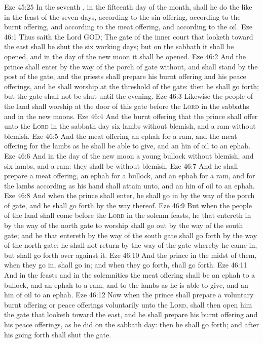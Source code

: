 \vs Eze 45:25 In the seventh , in the fifteenth day of the month, shall he do the like in the feast of the seven days, according to the sin offering, according to the burnt offering, and according to the meat offering, and according to the oil.
\vs Eze 46:1 Thus saith the Lord GOD; The gate of the inner court that looketh toward the east shall be shut the six working days; but on the sabbath it shall be opened, and in the day of the new moon it shall be opened.
\vs Eze 46:2 And the prince shall enter by the way of the porch of  gate without, and shall stand by the post of the gate, and the priests shall prepare his burnt offering and his peace offerings, and he shall worship at the threshold of the gate: then he shall go forth; but the gate shall not be shut until the evening.
\vs Eze 46:3 Likewise the people of the land shall worship at the door of this gate before the \textsc{Lord} in the sabbaths and in the new moons.
\vs Eze 46:4 And the burnt offering that the prince shall offer unto the \textsc{Lord} in the sabbath day  six lambs without blemish, and a ram without blemish.
\vs Eze 46:5 And the meat offering  an ephah for a ram, and the meat offering for the lambs as he shall be able to give, and an hin of oil to an ephah.
\vs Eze 46:6 And in the day of the new moon  a young bullock without blemish, and six lambs, and a ram: they shall be without blemish.
\vs Eze 46:7 And he shall prepare a meat offering, an ephah for a bullock, and an ephah for a ram, and for the lambs according as his hand shall attain unto, and an hin of oil to an ephah.
\vs Eze 46:8 And when the prince shall enter, he shall go in by the way of the porch of  gate, and he shall go forth by the way thereof.
\vs Eze 46:9 But when the people of the land shall come before the \textsc{Lord} in the solemn feasts, he that entereth in by the way of the north gate to worship shall go out by the way of the south gate; and he that entereth by the way of the south gate shall go forth by the way of the north gate: he shall not return by the way of the gate whereby he came in, but shall go forth over against it.
\vs Eze 46:10 And the prince in the midst of them, when they go in, shall go in; and when they go forth, shall go forth.
\vs Eze 46:11 And in the feasts and in the solemnities the meat offering shall be an ephah to a bullock, and an ephah to a ram, and to the lambs as he is able to give, and an hin of oil to an ephah.
\vs Eze 46:12 Now when the prince shall prepare a voluntary burnt offering or peace offerings voluntarily unto the \textsc{Lord},  shall then open him the gate that looketh toward the east, and he shall prepare his burnt offering and his peace offerings, as he did on the sabbath day: then he shall go forth; and after his going forth  shall shut the gate.
